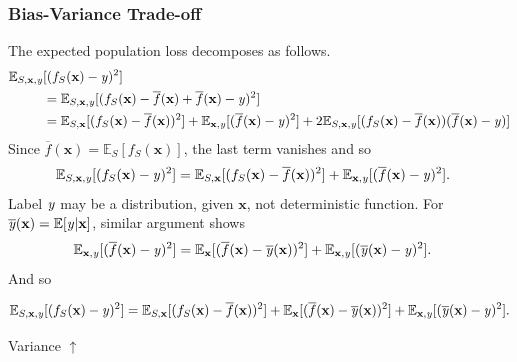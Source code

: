 \documentclass[smaller]{beamer}
\theoremstyle{example}
\newcommand{\x}{\textbf{x}}
\newcommand{\ix}[1]{{\it #1}}
\begin{document}
\begin{frame}
    \frametitle{Bias-Variance Trade-off}
    The expected population loss decomposes as follows.
    \begin{align*}
        \mathbb E_{S,\x, \ix y}&[(f_S(\x) - \ix y)^2] \\
            &= \mathbb E_{S,\x, \ix y}[(f_S(\x) - \overline{f}(\x) + \overline{f}(\x) - \ix y)^2] \\
            &= \mathbb E_{S,\x}[(f_S(\x) - \overline{f}(\x))^2] + \mathbb E_{\x,\ix y}[(\overline{f}(\x) - \ix y)^2] + 2\mathbb E_{S,\x,\ix y}[(f_S(\x)-\overline{f}(\x))(\overline{f}(\x) - \ix y)]
    \end{align*}
    Since $\overline{f}(\x) = \mathbb E_S[f_S(\x)]$, the last term vanishes and so
    \begin{align*}
        \mathbb E_{S,\x, \ix y}[(f_S(\x) - \ix y)^2] 
        &= \mathbb E_{S,\x}[(f_S(\x) - \overline{f}(\x))^2] + \mathbb E_{\x,\ix y}[(\overline{f}(\x) - \ix y)^2].
    \end{align*}
    Label $\ix y$ may be a distribution, given $\x$, not deterministic function. For $\overline{\ix y}(\x)=\mathbb E[\ix y|\x]$, similar argument shows 
    \begin{align*}
        \mathbb E_{\x, \ix y}[(\overline{f}(\x) - \ix y)^2] 
        &= \mathbb E_{\x}[(\overline{f}(\x) - \overline{\ix y}(\x))^2] + \mathbb E_{\x,\ix y}[(\overline{\ix y}(\x) - \ix y)^2].
    \end{align*}
    And so 
    {\small
    \[\mathbb E_{S,\x, \ix y}[(f_S(\x) - \ix y)^2]  
     = \mathbb E_{S,\x}[(f_S(\x) - \overline{f}(\x))^2] + \mathbb E_{\x}[(\overline{f}(\x) - \overline{\ix y}(\x))^2] + \mathbb E_{\x,\ix y}[(\overline{\ix y}(\x) - \ix y)^2].\]
     \begin{flushright}{\color{blue}Variance $\uparrow$}\qquad\qquad\qquad{}\qquad\qquad{}\qquad\quad\phantom{i} \end{flushright}
    }
\end{frame}
\end{document}
